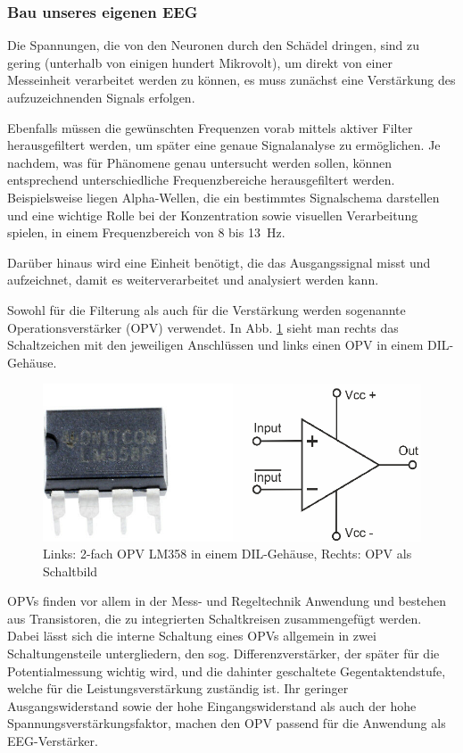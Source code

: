 \documentclass[10pt]{article}
\begin{document}
\subsubsection{Bau unseres eigenen EEG}
 
Die Spannungen, die von den Neuronen durch den Schädel dringen, sind zu gering (unterhalb von einigen hundert Mikrovolt), um direkt von einer Messeinheit verarbeitet werden zu können, es muss zunächst eine Verstärkung des aufzuzeichnenden Signals erfolgen. \cite{EEGHausarbeit}

Ebenfalls müssen die gewünschten Frequenzen vorab mittels aktiver Filter herausgefiltert werden, um später eine genaue Signalanalyse zu ermöglichen. 
Je nachdem, was für Phänomene genau untersucht werden sollen, können entsprechend unterschiedliche Frequenzbereiche herausgefiltert werden. 
Beispielsweise liegen Alpha-Wellen, die ein bestimmtes Signalschema darstellen und eine wichtige Rolle bei der Konzentration sowie visuellen Verarbeitung spielen, in einem Frequenzbereich von 8 bis 13 Hz. \cite{Praktikum, Birbaumer2010, wiki:Berger-Effekt}
 
 Darüber hinaus wird eine Einheit benötigt, die das Ausgangssignal misst und aufzeichnet, damit es weiterverarbeitet und analysiert werden kann. 
 
Sowohl für die Filterung als auch für die Verstärkung werden sogenannte Operationsverstärker (OPV) verwendet. 
In Abb. \ref{fig:OPV} sieht man rechts das Schaltzeichen mit den jeweiligen Anschlüssen und links einen OPV in einem DIL-Gehäuse. 
 
 \begin{figure}[h!]
    \centering
    \includegraphics[width=0.5\linewidth]{pictures/OPV_cropped.png}
    \caption{Links: 2-fach OPV LM358 in einem DIL-Gehäuse, Rechts: OPV als Schaltbild }
    \label{fig:OPV}
\end{figure}

OPVs finden vor allem in der Mess- und Regeltechnik Anwendung und bestehen aus Transistoren, die zu integrierten Schaltkreisen zusammengefügt werden.
Dabei lässt sich die interne Schaltung eines OPVs allgemein in zwei Schaltungensteile untergliedern, den sog. Differenzverstärker, der später für die Potentialmessung wichtig wird, und die dahinter geschaltete Gegentaktendstufe, welche
für die Leistungsverstärkung zuständig ist.
Ihr geringer Ausgangswiderstand sowie der hohe Eingangswiderstand als auch der hohe Spannungsverstärkungsfaktor, machen den OPV passend für die Anwendung als EEG-Verstärker.
\end{document}
